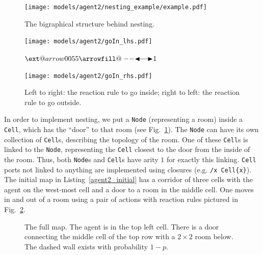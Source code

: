 \documentclass[runningheads]{llncs}
\makeatletter
\providecommand\longdoublearrowRHD{\mathrel\LHD\joinrel\relbar\joinrel\relbar\joinrel\mathrel\RHD}
\providecommand*\xdoublearrowRHD[2][]{\ext@arrow 0055{\arrowfill@\relbar\relbar\longdoublearrowRHD}{#1}{#2}}
\makeatother
\begin{document}
\begin{figure}
  \centering
  \texttt{[image: models/agent2/nesting\_example/example.pdf]}
  \caption{The bigraphical structure behind nesting.}
  \label{agent2_nesting}
\end{figure}



\begin{figure}
  \centering
  \begin{minipage}{0.45\textwidth}
    \centering
    \texttt{[image: models/agent2/goIn\_lhs.pdf]}
  \end{minipage}
  $\xdoublearrowRHD{1}$
  \begin{minipage}{0.45\textwidth}
    \centering
    \texttt{[image: models/agent2/goIn\_rhs.pdf]}
  \end{minipage}
  \caption{Left to right: the reaction rule to go inside; right to left: the
    reaction rule to go outside.}
  \label{go_in_out}
\end{figure}

In order to implement nesting, we put a \texttt{Node} (representing a room)
inside a \texttt{Cell}, which has the ``door'' to that room (see
Fig.~\ref{agent2_nesting}). The \texttt{Node} can have its own collection of
\texttt{Cell}s, describing the topology of the room. One of these \texttt{Cell}s
is linked to the \texttt{Node}, representing the \texttt{Cell} closest to the
door from the inside of the room. Thus, both \texttt{Node}s and \texttt{Cell}s
have arity $1$ for exactly this linking. \texttt{Cell} ports not linked to
anything are implemented using closures (e.g. \texttt{/x Cell\{x\}}). The
initial map in Listing~\ref{agent2_initial} has a corridor of three cells with
the agent on the west-most cell and a door to a room in the middle cell. One
moves in and out of a room using a pair of actions with reaction rules pictured
in Fig.~\ref{go_in_out}.

\begin{figure}
  \centering
  \caption{The full map. The agent is in the top left cell. There is a door
    connecting the middle cell of the top row with a $2 \times 2$ room below.
    The dashed wall exists with probability $1-p$.}
  \label{agent2_map}
\end{figure}
\end{document}
